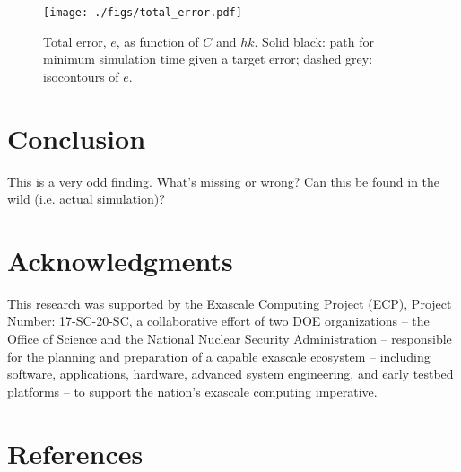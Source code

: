 \documentclass[review]{elsarticle}
\begin{document}
\begin{figure}[!tbp]%
  \centering%
  \texttt{[image: ./figs/total\_error.pdf]}%
  \caption{Total error, $e$, as function of $C$ and $hk$. Solid black: path for minimum simulation time given a target error; dashed grey: isocontours of $e$.}\label{fig:total_error}%
\end{figure}%


\section{Conclusion}\label{sec:ccl}
This is a very odd finding. What's missing or wrong? Can this be found in the wild (i.e. actual simulation)?

\section*{Acknowledgments}
This research was supported by the Exascale Computing Project (ECP), Project Number: 17-SC-20-SC, a collaborative effort of two DOE organizations -- the Office of Science and the National Nuclear Security Administration -- responsible for the planning and preparation of a capable exascale ecosystem -- including software, applications, hardware, advanced system engineering, and early testbed platforms -- to support the nation's exascale computing imperative.

\section*{References}


\end{document}
